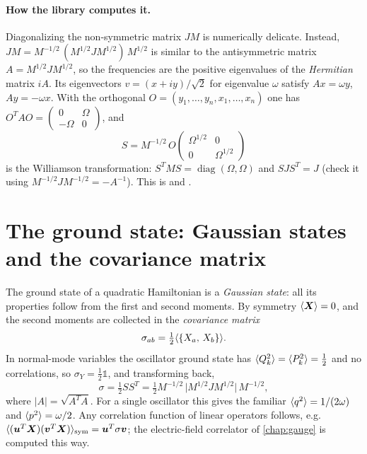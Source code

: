 \paragraph{How the library computes it.} Diagonalizing the non-symmetric matrix $JM$ is numerically delicate.
Instead, $JM = M^{-1/2}\,(M^{1/2} J M^{1/2})\,M^{1/2}$ is similar to the antisymmetric matrix
$A = M^{1/2} J M^{1/2}$, so the frequencies are the positive eigenvalues of the \emph{Hermitian} matrix $iA$.
Its eigenvectors $v = (x + iy)/\sqrt2$ for eigenvalue $\omega$ satisfy $Ax = \omega y$, $Ay = -\omega x$. With the
orthogonal $O = (y_1,\dots,y_n,x_1,\dots,x_n)$ one has $O^T A O = \begin{pmatrix}0&\Omega\\-\Omega&0\end{pmatrix}$,
and
\begin{equation}
  S = M^{-1/2}\, O \begin{pmatrix}\Omega^{1/2}&0\\0&\Omega^{1/2}\end{pmatrix}
\end{equation}
is the Williamson transformation: $S^TMS = \operatorname{diag}(\Omega,\Omega)$ and $SJS^T = J$ (check it using
$M^{-1/2} J M^{-1/2} = -A^{-1}$). This is  and .

\section{The ground state: Gaussian states and the covariance matrix}
The ground state of a quadratic Hamiltonian is a \emph{Gaussian state}: all its properties follow from the
first and second moments. By symmetry $\langle \bm{X}\rangle = 0$, and the second moments are collected in the
\emph{covariance matrix}
\begin{equation}
  \sigma_{ab} = \tfrac12 \langle \{X_a,\,X_b\}\rangle .
\end{equation}
In normal-mode variables the oscillator ground state has $\langle Q_k^2\rangle = \langle P_k^2\rangle = \frac12$ and no
correlations, so $\sigma_Y = \frac12\mathbb{1}$, and transforming back,
\begin{equation}\label{eq:sigma}
  \sigma = \tfrac12 S S^T
  = \tfrac12 M^{-1/2}\,\bigl|M^{1/2} J M^{1/2}\bigr|\,M^{-1/2},
\end{equation}
where $|A| = \sqrt{A^TA}$. For a single oscillator this gives the familiar
$\langle q^2\rangle = 1/(2\omega)$ and $\langle p^2\rangle = \omega/2$. Any correlation function of linear operators
follows, e.g.\ $\langle (\bm{u}^T\bm{X})(\bm{v}^T\bm{X})\rangle_{\rm sym} = \bm{u}^T\sigma\bm{v}$; the electric-field
correlator of \cref{chap:gauge} is computed this way.

